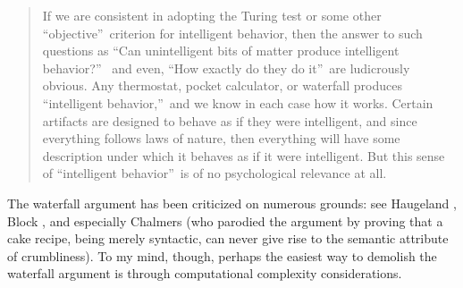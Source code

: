 \documentclass[12pt,onecolumn]{article}%
\begin{document}
\begin{quotation}
\noindent If we are consistent in adopting the Turing test or some other
\textquotedblleft objective\textquotedblright\  criterion for intelligent
behavior, then the answer to such questions as \textquotedblleft Can
unintelligent bits of matter produce intelligent behavior?\textquotedblright\ %
 and even, \textquotedblleft How exactly do they do it\textquotedblright\  are
ludicrously obvious. Any thermostat, pocket calculator, or waterfall
produces \textquotedblleft intelligent behavior,\textquotedblright\  and we
know in each case how it works. Certain artifacts are designed to behave as
if they were intelligent, and since everything follows laws of nature, then
everything will have some description under which it behaves as if it were
intelligent. But this sense of \textquotedblleft intelligent
behavior\textquotedblright\  is of no psychological relevance at all.
\end{quotation}

The waterfall argument has been criticized on numerous grounds: see Haugeland
\cite{haugeland}, Block \cite{block}, and especially Chalmers \cite{chalmers}
(who parodied the argument by proving that a cake recipe, being merely
syntactic, can never give rise to the semantic attribute of crumbliness). To
my mind, though, perhaps the easiest way to demolish the waterfall argument is
through computational complexity considerations.
\end{document}
